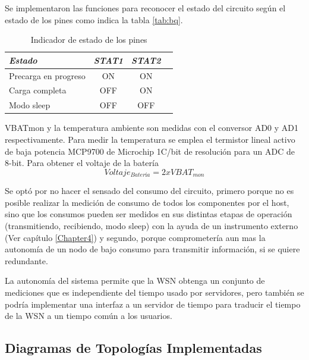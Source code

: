{Se implementaron las funciones para reconocer el estado del circuito según el estado de los pines como indica la tabla \ref{tab:bq}.

\begin{table}[ht]
	\centering
	\caption{Indicador de estado de los pines}
	\begin{tabular}{@{} l *3c @{}}    \toprule
		\emph{\textbf{Estado}} & \emph{\textbf{STAT1}} & \emph{\textbf{STAT2}}\\
		\midrule
		Precarga en progreso &  ON & ON \\	
		Carga completa &  OFF & ON \\
		Modo sleep &  OFF & OFF \\
		\bottomrule
		\hline
	\end{tabular}
	\label{tab:STAT}
\end{table}

VBATmon y la temperatura ambiente son medidas con el conversor AD0 y AD1 respectivamente. Para medir la temperatura se emplea el termistor lineal activo de baja potencia MCP9700 de Microchip \citep{termis} 1\grados C/bit de resolución para un ADC de 8-bit. Para obtener el voltaje de la batería 
\[Voltaje_{Batería}=2xVBAT_{mon}\]


Se optó por no hacer el sensado del consumo del circuito, primero porque no es posible realizar la medición de consumo de todos los componentes por el host, sino que los consumos pueden ser medidos en sus distintas etapas de operación (transmitiendo, recibiendo, modo sleep) con la ayuda de un instrumento externo (Ver capítulo \ref{Chapter4}) y segundo, porque comprometería aun mas la autonomía de un nodo de bajo consumo para transmitir información, si se quiere redundante.

La autonomía del sistema permite que la WSN obtenga un conjunto de mediciones que es independiente del tiempo usado por servidores, pero también se podría implementar una interfaz a un servidor de tiempo para traducir el tiempo de la WSN a un tiempo común a los usuarios.


\subsection{Diagramas de Topologías Implementadas}
\label{subsec:topo} 

}
